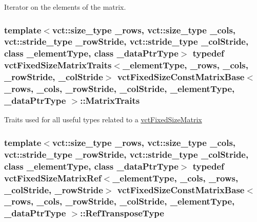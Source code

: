 Iterator on the elements of the matrix. \hypertarget{classvct_fixed_size_const_matrix_base_a013c7db3c4e38c1573c29ee8ff40016f}{
\subsubsection[{Matrix\-Traits}]{\setlength{\rightskip}{0pt plus 5cm}template$<$vct\-::size\-\_\-type \-\_\-rows, vct\-::size\-\_\-type \-\_\-cols, vct\-::stride\-\_\-type \-\_\-row\-Stride, vct\-::stride\-\_\-type \-\_\-col\-Stride, class \-\_\-element\-Type, class \-\_\-data\-Ptr\-Type$>$ typedef {\bf vct\-Fixed\-Size\-Matrix\-Traits}$<$\-\_\-element\-Type, \-\_\-rows, \-\_\-cols, \-\_\-row\-Stride, \-\_\-col\-Stride$>$ {\bf vct\-Fixed\-Size\-Const\-Matrix\-Base}$<$ \-\_\-rows, \-\_\-cols, \-\_\-row\-Stride, \-\_\-col\-Stride, \-\_\-element\-Type, \-\_\-data\-Ptr\-Type $>$\-::{\bf Matrix\-Traits}}}\label{classvct_fixed_size_const_matrix_base_a013c7db3c4e38c1573c29ee8ff40016f}
Traits used for all useful types related to a \hyperlink{classvct_fixed_size_matrix}{vct\-Fixed\-Size\-Matrix} \hypertarget{classvct_fixed_size_const_matrix_base_a8d6e7ad2cf2cd82aebbc3de0d6479dbe}{
\subsubsection[{Ref\-Transpose\-Type}]{\setlength{\rightskip}{0pt plus 5cm}template$<$vct\-::size\-\_\-type \-\_\-rows, vct\-::size\-\_\-type \-\_\-cols, vct\-::stride\-\_\-type \-\_\-row\-Stride, vct\-::stride\-\_\-type \-\_\-col\-Stride, class \-\_\-element\-Type, class \-\_\-data\-Ptr\-Type$>$ typedef {\bf vct\-Fixed\-Size\-Matrix\-Ref}$<$\-\_\-element\-Type, \-\_\-cols, \-\_\-rows, \-\_\-col\-Stride, \-\_\-row\-Stride$>$ {\bf vct\-Fixed\-Size\-Const\-Matrix\-Base}$<$ \-\_\-rows, \-\_\-cols, \-\_\-row\-Stride, \-\_\-col\-Stride, \-\_\-element\-Type, \-\_\-data\-Ptr\-Type $>$\-::{\bf Ref\-Transpose\-Type}}}\label{classvct_fixed_size_const_matrix_base_a8d6e7ad2cf2cd82aebbc3de0d6479dbe}
